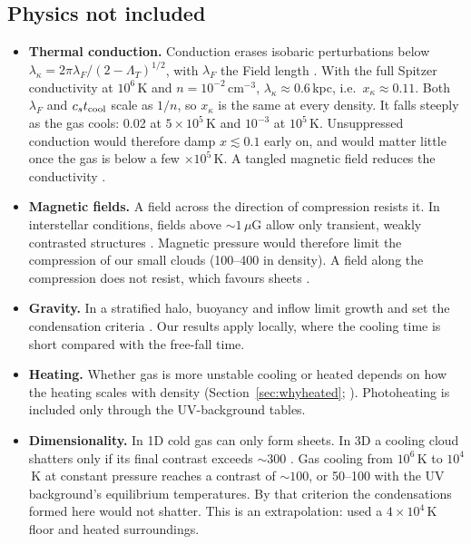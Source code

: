 \documentclass[11pt]{article}
\newcommand{\cstc}{c_s t_{\rm cool}}
\newcommand{\LT}{\Lambda_T}
\begin{document}
\subsection{Physics not included}
\begin{itemize}
\item \textbf{Thermal conduction.} Conduction erases isobaric perturbations below
  $\lambda_\kappa=2\pi\lambda_F/(2-\LT)^{1/2}$, with $\lambda_F$ the Field length
  \citep{field65,burkert00}. With the full Spitzer conductivity at $10^6$\,K and
  $n=10^{-2}$\,cm$^{-3}$, $\lambda_\kappa\approx0.6$\,kpc, i.e.\
  $x_\kappa\approx0.11$. Both $\lambda_F$ and $\cstc$ scale as $1/n$, so $x_\kappa$ is
  the same at every density. It falls steeply as the gas cools: 0.02 at
  $5\times10^5$\,K and $10^{-3}$ at $10^5$\,K. Unsuppressed conduction would
  therefore damp $x\lesssim0.1$ early on, and would matter little once the gas is
  below a few $\times10^5$\,K. A tangled magnetic field reduces the conductivity
  \citep{burkert00}.
\item \textbf{Magnetic fields.} A field across the direction of compression resists
  it. In interstellar conditions, fields above $\sim1\,\mu$G allow only transient,
  weakly contrasted structures \citep{hennebelle00}. Magnetic pressure would
  therefore limit the compression of our small clouds (100--400 in density). A field
  along the compression does not resist, which favours sheets \citep{schwarz72}.
\item \textbf{Gravity.} In a stratified halo, buoyancy and inflow limit growth and
  set the condensation criteria \citep{balbus89,mccourt12,sharma12,choudhury19,mohapatra23}. Our results apply locally, where the cooling time is short
  compared with the free-fall time.
\item \textbf{Heating.} Whether gas is more unstable cooling or heated depends on
  how the heating scales with density (Section~\ref{sec:whyheated};
  \citealt{field65}). Photoheating is included only through the UV-background tables.
\item \textbf{Dimensionality.} In 1D cold gas can only form sheets. In 3D a cooling
  cloud shatters only if its final contrast exceeds $\sim300$
  \citep{mccourt18,gronke20}. Gas cooling from $10^6$\,K to $10^4$\,K at constant
  pressure reaches a contrast of $\sim100$, or 50--100 with the UV background's
  equilibrium temperatures. By that criterion the condensations formed here would
  not shatter. This is an extrapolation: \citet{gronke20} used a $4\times10^4$\,K
  floor and heated surroundings.

\end{itemize}
\end{document}
